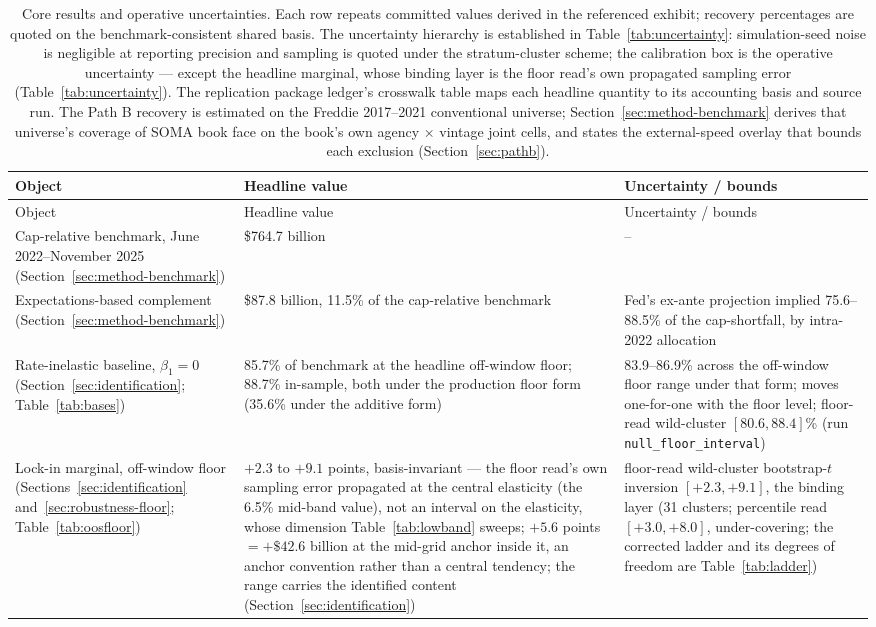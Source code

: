\documentclass[12pt]{article}
\begin{document}
{\footnotesize
\begin{longtable}{@{}p{4.6cm}p{4.6cm}p{5.3cm}@{}}
\caption{Core results and operative uncertainties. Each row repeats committed values derived in the referenced exhibit; recovery percentages are quoted on the benchmark-consistent shared basis. The uncertainty hierarchy is established in Table~\ref{tab:uncertainty}: simulation-seed noise is negligible at reporting precision and sampling is quoted under the stratum-cluster scheme; the calibration box is the operative uncertainty --- except the headline marginal, whose binding layer is the floor read's own propagated sampling error (Table~\ref{tab:uncertainty}). The replication package ledger's crosswalk table maps each headline quantity to its accounting basis and source run. The Path B recovery is estimated on the Freddie 2017--2021 conventional universe; Section~\ref{sec:method-benchmark} derives that universe's coverage of SOMA book face on the book's own agency $\times$ vintage joint cells, and states the external-speed overlay that bounds each exclusion (Section~\ref{sec:pathb}).}
\label{tab:headline}\\
\toprule
Object & Headline value & Uncertainty / bounds \\
\midrule
\endfirsthead
\toprule
Object & Headline value & Uncertainty / bounds \\
\midrule
\endhead
Cap-relative benchmark, June 2022--November 2025 (Section~\ref{sec:method-benchmark}) & \$764.7 billion & -- \\
Expectations-based complement (Section~\ref{sec:method-benchmark}) & \$87.8 billion, 11.5\% of the cap-relative benchmark & Fed's ex-ante projection implied 75.6--88.5\% of the cap-shortfall, by intra-2022 allocation \\
Rate-inelastic baseline, $\beta_1 = 0$ (Section~\ref{sec:identification}; Table~\ref{tab:bases}) & 85.7\% of benchmark at the headline off-window floor; 88.7\% in-sample, both under the production floor form (35.6\% under the additive form) & 83.9--86.9\% across the off-window floor range under that form; moves one-for-one with the floor level; floor-read wild-cluster $[80.6, 88.4]$\% (run \texttt{null\_floor\_interval}) \\
Lock-in marginal, off-window floor (Sections~\ref{sec:identification} and~\ref{sec:robustness-floor}; Table~\ref{tab:oosfloor}) & $+2.3$ to $+9.1$ points, basis-invariant --- the floor read's own sampling error propagated at the central elasticity (the 6.5\% mid-band value), not an interval on the elasticity, whose dimension Table~\ref{tab:lowband} sweeps; $+5.6$ points $= +\$42.6$ billion at the mid-grid anchor inside it, an anchor convention rather than a central tendency; the range carries the identified content (Section~\ref{sec:identification}) & floor-read wild-cluster bootstrap-$t$ inversion $[+2.3, +9.1]$, the binding layer (31 clusters; percentile read $[+3.0, +8.0]$, under-covering; the corrected ladder and its degrees of freedom are Table~\ref{tab:ladder})\tnote{a} \\

\end{longtable}}
\end{document}
